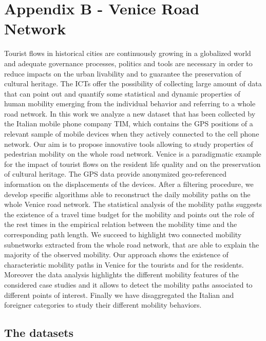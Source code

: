 \documentclass{standalone}
\begin{document}
\chapter*{Appendix B - Venice Road Network}

Tourist flows in historical cities are continuously growing in a globalized world and adequate governance processes, politics and tools are necessary in order to reduce impacts on the urban livability and to guarantee the preservation of cultural heritage.
The ICTs offer the possibility of collecting large amount of data that can point out and quantify some statistical and dynamic properties of human mobility emerging from the individual behavior and referring to a whole road network.
In this work we analyze a new dataset that has been collected by the Italian mobile phone company TIM, which contains the GPS positions of a relevant sample of mobile devices when they actively connected to the cell phone network.
Our aim is to propose innovative tools allowing to study properties of pedestrian mobility on the whole road network.
Venice is a paradigmatic example for the impact of tourist flows on the resident life quality and on the preservation of cultural heritage.
The GPS data provide anonymized geo-referenced information on the displacements of the devices.
After a filtering procedure, we develop specific algorithms able to reconstruct the daily mobility paths on the whole Venice road network.
The statistical analysis of the mobility paths suggests the existence of a travel time budget for the mobility and points out the role of the rest times in the empirical relation between the mobility time and the corresponding path length.
We succeed to highlight two connected mobility subnetworks extracted from the whole road network, that are able to explain the majority of the observed mobility.
Our approach shows the existence of characteristic mobility paths in Venice for the tourists and for the residents.
Moreover the data analysis highlights the different mobility features of the considered case studies and it allows to detect the mobility paths associated to different points of interest.
Finally we have disaggregated the Italian and foreigner categories to study their different mobility behaviors.

\section*{The datasets}
\end{document}
